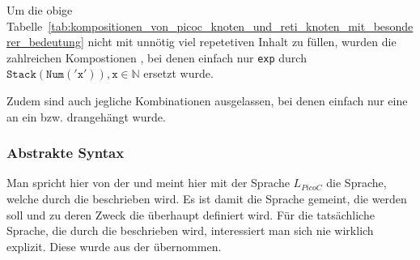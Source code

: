 \begin{Special_Paragraph}
  Um die obige Tabelle~\ref{tab:kompositionen_von_picoc_knoten_und_reti_knoten_mit_besonderer_bedeutung} nicht mit unnötig viel repetetiven Inhalt zu füllen, wurden die zahlreichen Kompostionen , bei denen einfach nur \verb|exp| durch $\mathtt{Stack(Num('x')), x}\in\mathbb{N}$ ersetzt wurde.

  Zudem sind auch jegliche Kombinationen ausgelassen, bei denen einfach nur eine  an ein  bzw.   drangehängt wurde.
\end{Special_Paragraph}

\subsubsection{Abstrakte Syntax}
\label{sec:abstrakte_syntax}

\newpage

\begin{grammar}
  \toprule
  \commentsecond
  \midrule
  \arith
  \midrule
  \logic
  \midrule
  \assign
  \midrule
  \pntr
  \midrule
  \arraysecond
  \midrule
  \struct
  \midrule
  \ifelse
  \midrule
  \loopsecond
  \midrule
  \fun
  \midrule
  \file
  \bottomrule
\end{grammar}

\begin{Special_Paragraph}
  Man spricht hier von der  und meint hier mit der Sprache $L_{PicoC}$  die Sprache, welche durch die  beschrieben wird. Es ist damit  die Sprache gemeint, die  werden soll und zu deren Zweck die  überhaupt definiert wird. Für die tatsächliche Sprache, die durch die  beschrieben wird, interessiert man sich nie wirklich explizit. Diese  wurde aus der  \cite{g_siek_course_2022} übernommen.
\end{Special_Paragraph}

